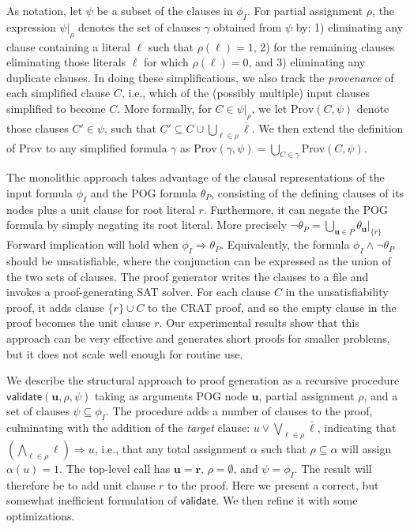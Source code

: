 \documentclass[letterpaper,USenglish,cleveref, autoref, thm-restate]{lipics-v2021}
\newcommand{\obar}[1]{\overline{#1}}
\newcommand{\lit}{\ell}
\newcommand{\imply}{\Rightarrow}
\newcommand{\assign}{\alpha}
\newcommand{\passign}{\rho}
\newcommand{\validate}{\textsf{validate}}
\newcommand{\prov}{\textrm{Prov}}
\newcommand{\inputformula}{\phi_I}
\newcommand{\pogformula}{\theta_P}
\newcommand{\makenode}[1]{\mathbf{#1}}
\newcommand{\nodeu}{\makenode{u}}
\newcommand{\noder}{\makenode{r}}
\newcommand{\simplify}[2]{#1|_{#2}}
\begin{document}
As notation,
let $\psi$ be a subset of the clauses in $\inputformula$.
For partial assignment
$\passign$, the expression  $\simplify{\psi}{\passign}$ denotes the set of clauses $\gamma$
obtained from $\psi$ by: 1) eliminating any
clause containing a literal $\lit$ such that $\passign(\lit) = 1$,
2) for the remaining clauses eliminating those literals $\lit$ for
which $\passign(\lit) = 0$, and 3) eliminating any duplicate clauses.
In doing these simplifications, we also track the {\em provenance}
of each simplified clause $C$, i.e., which of the (possibly multiple) input clauses simplified to become $C$.
More formally, for $C \in \simplify{\psi}{\passign}$, we let $\prov(C, \psi)$ denote
those clauses $C' \in \psi$, such that
$C' \subseteq C \cup \bigcup_{\lit \in \passign} \obar{\lit}$.
We then extend the definition of $\prov$ to any simplified formula
$\gamma$ as $\prov(\gamma, \psi) = \bigcup_{C \in \gamma} \prov(C, \psi)$.

The monolithic approach
takes advantage of the clausal representations of
the input formula $\inputformula$ and the POG formula $\pogformula$, consisting of the defining clauses of its nodes plus a unit clause for root literal $r$.
Furthermore, it can
negate the POG formula by simply negating its root literal.  More precisely $\neg \pogformula = \bigcup_{\nodeu\in P} \simplify{\theta_{\nodeu}}{\{\obar{r}\}}$
Forward implication
will hold
when $\inputformula \imply \pogformula$.  Equivalently,
the formula $\inputformula \land \neg \pogformula$
should be unsatisfiable, where the
conjunction can be expressed as the union
of the two sets of clauses.  The proof generator writes the clauses to a file and invokes a proof-generating SAT solver.
For each clause $C$ in the unsatisfiability proof, it adds clause $\{r\} \cup C$ to the CRAT proof, and so the empty clause in the proof becomes the unit clause $r$.
Our experimental results show
that this approach can be very effective and generates short proofs
for smaller problems, but it does not scale well enough for routine
use.


We describe the structural approach to proof generation as a recursive procedure
$\validate(\nodeu, \passign, \psi)$ taking as arguments POG
node $\nodeu$, partial assignment
$\passign$, and a set of clauses $\psi \subseteq \inputformula$.
The procedure adds a number of clauses to the proof, culminating with
the addition of the {\em target} clause:
$u \lor \bigvee_{\lit \in \passign} \obar{\lit}$, indicating
that $\left(\bigwedge_{\lit \in \passign} \lit\right) \imply u$, i.e.,
that any total
assignment $\assign$ such that $\passign \subseteq \assign$
will assign $\assign(u) = 1$.
The top-level call has $\nodeu = \noder$, $\passign = \emptyset$, and $\psi = \inputformula$.
The result will therefore be to add unit clause $r$ to the proof.
Here we present a correct, but somewhat inefficient formulation of
$\validate$.  We then refine it with some optimizations.
\end{document}

